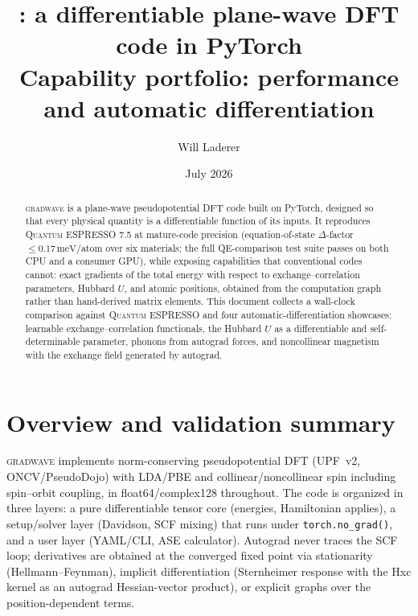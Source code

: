 \documentclass[11pt]{article}
\title{\gw: a differentiable plane-wave DFT code in PyTorch\\
\large Capability portfolio: performance and automatic differentiation}
\author{Will Laderer}
\date{July 2026}
\newcommand{\gw}{\textsc{gradwave}}
\newcommand{\qe}{\textsc{Quantum ESPRESSO}}
\newcommand{\meV}{\,\mathrm{meV}}
\begin{document}
\maketitle

\begin{abstract}
\gw{} is a plane-wave pseudopotential DFT code built on PyTorch, designed so
that every physical quantity is a differentiable function of its inputs.
It reproduces \qe{} 7.5 at mature-code precision (equation-of-state
$\Delta$-factor $\leq 0.17\meV$/atom over six materials; the full
QE-comparison test suite passes on both CPU and a consumer GPU), while
exposing capabilities that conventional codes cannot: exact gradients of the
total energy with respect to exchange--correlation parameters, Hubbard $U$,
and atomic positions, obtained from the computation graph rather than
hand-derived matrix elements. This document collects a wall-clock comparison
against \qe{} and four automatic-differentiation showcases: learnable
exchange--correlation functionals, the Hubbard $U$ as a differentiable and
self-determinable parameter, phonons from autograd forces, and noncollinear
magnetism with the exchange field generated by autograd.
\end{abstract}

\section{Overview and validation summary}

\gw{} implements norm-conserving pseudopotential DFT (UPF~v2, ONCV/PseudoDojo)
with LDA/PBE and collinear/noncollinear spin including spin--orbit coupling,
in float64/complex128 throughout. The code is organized in three layers:
a pure differentiable tensor core (energies, Hamiltonian applies), a
setup/solver layer (Davidson, SCF mixing) that runs under
\texttt{torch.no\_grad()}, and a user layer (YAML/CLI, ASE calculator).
Autograd never traces the SCF loop; derivatives are obtained at the converged
fixed point via stationarity (Hellmann--Feynman), implicit differentiation
(Sternheimer response with the Hxc kernel as an autograd Hessian-vector
product), or explicit graphs over the position-dependent terms.
\end{document}
